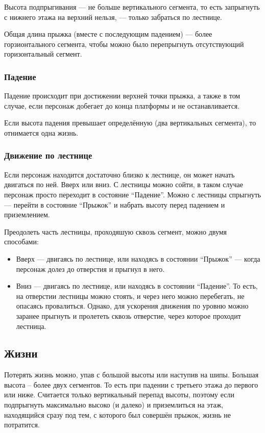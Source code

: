\documentclass[12pt,a4paper,fullpage]{article}
\begin{document}
Высота подпрыгивания --- не больше вертикального сегмента, то есть запрыгнуть с нижнего этажа на верхний нельзя, --- только забраться по лестнице.

Общая длина прыжка (вместе с последующим падением) --- более горзионтального сегмента, чтобы можно было перепрыгнуть отсутствующий горизонтальный сегмент.
\subsubsection{Падение}
Падение происходит при достижении верхней точки прыжка, а также в том случае, если персонаж добегает до конца платформы и не останавливается.

Если высота падения превышает определённую (два вертикальных сегмента), то отнимается одна жизнь.
\subsubsection{Движение по лестнице}
Если персонаж находится достаточно близко к лестнице, он может начать двигаться по ней. Вверх или вниз. С лестницы можно сойти, в таком случае персонаж просто переходит в состояние ``Падение''. Можно с лестницы спрыгнуть --- перейти в состояние ``Прыжок'' и набрать высоту перед падением и приземлением.

Преодолеть часть лестницы, проходяшую сквозь сегмент, можно двумя способами:
\begin{itemize}
\item Вверх --- двигаясь по лестнице, или находясь в состоянии ``Прыжок'' --- когда персонаж долез до отверстия и прыгнул в него.
\item Вниз --- двигаясь по лестнице, или находясь в состоянии ``Падение''. То есть, на отверстии лестницы можно стоять, и через него можно перебегать, не опасаясь провалиться. Однако, для ускорения движения по уровню можно заранее прыгнуть и пролететь сквозь отверстие, через которое проходит лестница.
\end{itemize}
\subsection{Жизни}
Потерять жизнь можно, упав с большой высоты или наступив на шипы. Большая высота -- более двух сегментов. То есть при падении с третьего этажа до первого или ниже. Считается только вертикальный перепад высоты, поэтому если подпрыгнуть максимально высоко (и далеко) и приземлиться на этаж, находящийся сразу под тем, с которого был совершён прыжок, жизнь не потратится.
\end{document}
